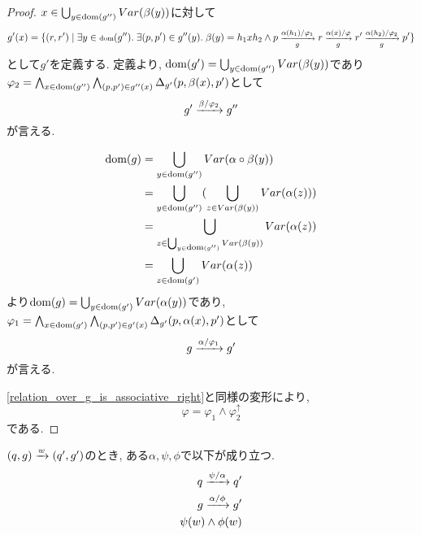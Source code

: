 \documentclass[uplatex,dvipdfmx,a4j]{jsreport}
\begin{document}
  \begin{proof}
    $x \in \bigcup_{y \in \scriptsize \dom(g'')} Var(\beta(y))$に対して
    \[
    g'(x) = \{ (r, r') \mid \exists y \in \scriptsize \dom(g'').\ \exists (p, p') \in g''(y).\
    \beta(y) = h_1 x h_2 \land p \transarrow{\alpha(h_1) / \varphi_1}{g} r
    \transarrow{\alpha(x) / \varphi}{g} r' \transarrow{\alpha(h_2) / \varphi_2}{g} p'\}
    \]
    として$g'$を定義する.
    定義より, $\dom(g') = \bigcup_{y \in \scriptsize \dom(g'')} Var(\beta(y))$であり
    $\varphi_2 = \bigwedge_{x \in \scriptsize \dom(g'')} \bigwedge_{(p, p') \in g''(x)}
    \Delta_{g'}(p, \beta(x), p')$として
    \[
      g' \transarrow{\beta / \varphi_2}{} g''
    \]
    が言える.

    \begin{align*}
      \dom(g) &= \bigcup_{y \in \scriptsize \dom(g'')} Var(\alpha \circ \beta(y)) \\
             &= \bigcup_{y \in \scriptsize \dom(g'')} (\bigcup_{z \in Var(\beta(y))} Var(\alpha(z))) \\
             &= \bigcup_{z \in \scriptsize \bigcup_{y \in \dom(g'')} Var(\beta(y))} Var(\alpha(z)) \\
             &= \bigcup_{z \in \scriptsize \dom(g')} Var(\alpha(z))
    \end{align*}
    より$\dom(g) = \bigcup_{y \in \scriptsize \dom(g')} Var(\alpha(y))$であり,
    $\varphi_1 = \bigwedge_{x \in \scriptsize \dom(g')} \bigwedge_{(p, p') \in g'(x)}
    \Delta_{g'}(p, \alpha(x), p')$として
    \[
      g \transarrow{\alpha / \varphi_1}{} g'
    \]
    が言える.

    \ref{relation_over_g_is_associative_right}と同様の変形により,
    \[
      \varphi = \varphi_1 \land \varphi_2^\uparrow
    \]
    である.
  \end{proof}

  \begin{lemma} \label{S_transition_and_g_tansition_are_derived_from_A'_transition}
    $(q, g) \transarrow{w}{} (q', g')$のとき,
    ある$\alpha, \psi, \phi$で以下が成り立つ.
    \begin{align*}
      q \transarrow{\psi / \alpha}{} q' \\
      g \transarrow{\alpha / \phi}{} g' \\
      \psi(w) \land \phi(w)
    \end{align*}
  \end{lemma}
\end{document}
